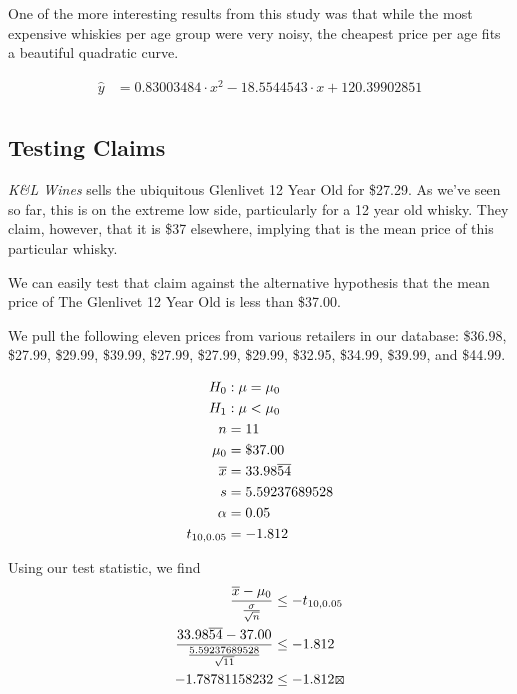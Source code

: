 One of the more interesting results from this study was that while the most expensive whiskies per age group were very noisy, the cheapest price per age fits a beautiful quadratic curve.

\begin{equation*}
\begin{split}
    \hat{y} &= 0.83003484 \cdot x^2 -18.5544543 \cdot x + 120.39902851\\
\end{split}
\end{equation*}


\subsection{Testing Claims}

\textit{K\&L Wines} sells the ubiquitous Glenlivet 12 Year Old for \$27.29. As we've seen so far, this is on the extreme low side, particularly for a 12 year old whisky. They claim, however, that it is \$37 elsewhere, implying that is the mean price of this particular whisky.\cite{KLWines}

We can easily test that claim against the alternative hypothesis that the mean price of The Glenlivet 12 Year Old is less than \$37.00. 

We pull the following eleven prices from various retailers in our database: \$36.98, \$27.99, \$29.99, \$39.99, \$27.99, \$27.99, \$29.99, \$32.95, \$34.99, \$39.99, and \$44.99. 


\begin{equation*}
\begin{split}
    H_0 &: \mu = \mu_0 \\
    H_1 &: \mu < \mu_0 \\
    n &= 11\\
    \mu_0 &= \$37.00\\
    \overline{x} &= 33.98\overline{54}\\
    s &= 5.59237689528\\
    \alpha &= 0.05\\
    t_{10, 0.05} &= -1.812\\
\end{split}
\end{equation*}

Using our test statistic, we find
\begin{equation*}
\begin{split}
    \frac{\overline{x} - \mu_0}{\frac{\sigma}{\sqrt{n}}} &\leq -t_{10, 0.05}\\
    \frac{33.98\repeating{54} - 37.00}{\frac{5.59237689528}{\sqrt{11}}} &\leq -1.812\\
    -1.78781158232 &\leq -1.812 \XBox\\
\end{split}
\end{equation*}

